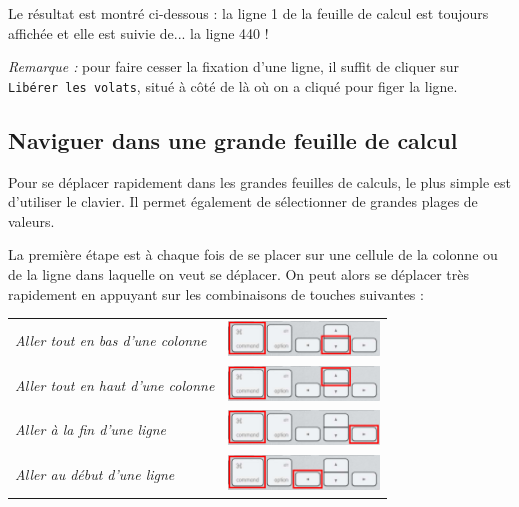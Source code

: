 Le résultat est montré ci-dessous : la ligne 1 de la feuille de calcul est toujours affichée et elle est suivie de... la ligne 440 !



\emph{Remarque :} pour faire cesser la fixation d'une ligne, il suffit de cliquer sur \texttt{Libérer les volats}, situé à côté de là où on a cliqué pour figer la ligne.


\subsection{Naviguer dans une grande feuille de calcul}\label{Calc3navigue} 
Pour se déplacer rapidement dans les grandes feuilles de calculs, le plus simple est d'utiliser le clavier. Il permet également de sélectionner de grandes plages de valeurs.

La première étape est à chaque fois de se placer sur une cellule de la colonne ou de la ligne dans laquelle on veut se déplacer. On peut alors se déplacer très rapidement en appuyant sur les combinaisons de touches suivantes :

\begin{center}
\begin{tabular}{ll}
\textsl{Aller tout en bas d'une colonne} & \includegraphics[width=4cm]{./images/tableur03/clavierCmDdown} \\     
\textsl{Aller tout en haut d'une colonne} & \includegraphics[width=4cm]{./images/tableur03/clavierCmDup} \\  
\textsl{Aller à la fin d'une ligne} & \includegraphics[width=4cm]{./images/tableur03/clavierCmDright} \\  
\textsl{Aller au début d'une ligne} & \includegraphics[width=4cm]{./images/tableur03/clavierCmDleft} \\  
\end{tabular}
\end{center}

